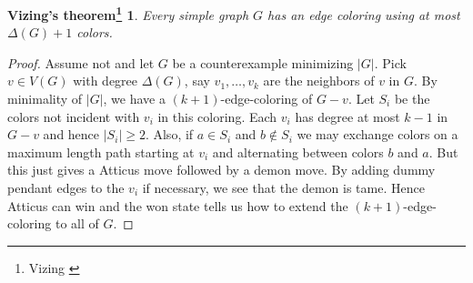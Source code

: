 \documentclass[12pt]{article}
\theoremstyle{plain}
\newtheorem*{vizing}{Vizing's theorem\footnote{Vizing \cite{vizing1965chromatic}}}
\theoremstyle{definition}
\theoremstyle{remark}
\newcommand{\card}[1]{\left|#1\right|}
\begin{document}
\begin{vizing}
Every simple graph $G$ has an edge coloring using at most $\Delta(G) + 1$ colors.
\end{vizing}
\begin{proof}
Assume not and let $G$ be a counterexample minimizing $\card{G}$. Pick $v \in V(G)$ with degree $\Delta(G)$, say $v_1, \ldots, v_k$ are the neighbors of $v$ in $G$. By minimality of $\card{G}$, we have a $(k + 1)$-edge-coloring of $G - v$.  Let $S_i$ be the colors not incident with $v_i$ in this coloring.  Each $v_i$ has degree at most $k-1$ in $G - v$ and hence $\card{S_i} \geq 2$.  Also, if $a \in S_i$ and $b \not \in S_i$ we may exchange colors on a maximum length path starting at $v_i$ and alternating between colors $b$ and $a$.  But this just gives a Atticus move followed by a demon move.  By adding dummy pendant edges to the $v_i$ if necessary, we see that the demon is tame.  Hence Atticus can win and the won state tells us how to extend the $(k+1)$-edge-coloring to all of $G$.
\end{proof}
\newpage



\end{document}
